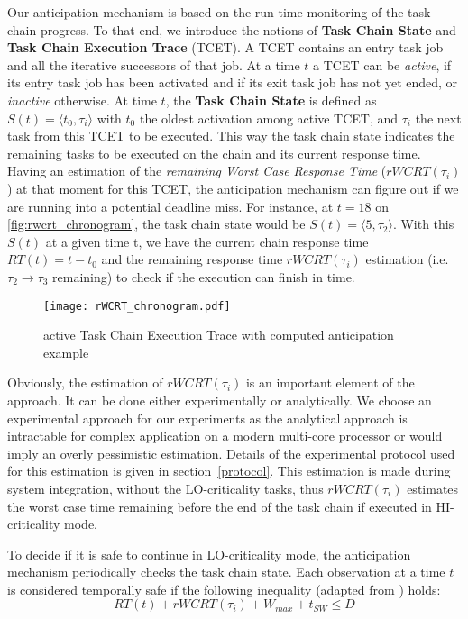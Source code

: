 \documentclass[french, a4paper, 11pt, twoside, pdftex]{StyleThese}
\begin{document}
    Our anticipation mechanism is based on the run-time monitoring of the task chain progress. To that end, we introduce the notions of \textbf{Task Chain State} and \textbf{Task Chain Execution Trace} (TCET). A TCET contains an entry task job and all the iterative successors of that job. At a time $t$ a TCET can be \emph{active}, if its entry task job has been activated and if its exit task job has not yet ended, or \emph{inactive} otherwise. 
    At time $t$, the \textbf{Task Chain State} is defined as $S(t)=\langle t_0, \tau_i\rangle$ with $t_0$ the oldest activation among active TCET, and $\tau_i$ the next task from this TCET to be executed. This way the task chain state indicates the remaining tasks to be executed on the chain and its current response time. Having an estimation of the \emph{remaining Worst Case Response Time} ($rWCRT(\tau_i)$) at that moment for this TCET, the anticipation mechanism can figure out if we are running into a potential deadline miss. For instance, at $t=18$ on \autoref{fig:rwcrt_chronogram}, the task chain state would be $S(t)=\langle 5, \tau_{2} \rangle $. With this $S(t)$ at a given time t, we have the current chain response time $RT(t) = t - t_0$ and the remaining response time $rWCRT(\tau_i)$ estimation (i.e. $\tau_2 \rightarrow \tau_3$ remaining) to check if the execution can finish in time.

    \begin{figure}
        \centering 
        \texttt{[image: rWCRT\_chronogram.pdf]}
        \caption{active Task Chain Execution Trace with computed anticipation example}
        \label{fig:rwcrt_chronogram}
    \end{figure}
    
    Obviously, the estimation of $rWCRT(\tau_i)$ is an important element of the approach. It can be done either experimentally or analytically. We choose an experimental approach for our experiments as the analytical approach is intractable for complex application on a modern multi-core processor or would imply an overly pessimistic estimation. Details of the experimental protocol used for this estimation is given in section~\ref{protocol}. %
    This estimation is made during system integration, without the LO-criticality tasks, thus $rWCRT(\tau_i)$ estimates the worst case time remaining before the end of the task chain if executed in HI-criticality mode. 

    To decide if it is safe to continue in LO-criticality mode, the anticipation mechanism periodically checks the task chain state. Each observation at a time $t$ is considered temporally safe if the following inequality (adapted from \cite{kritikakou_run-time_2014}) holds:
                \begin{equation} \label{safe_cond}
                RT(t) + rWCRT(\tau_i) + W_{max} + t_{SW} \leq D
                \end{equation} 
                 
\end{document}
